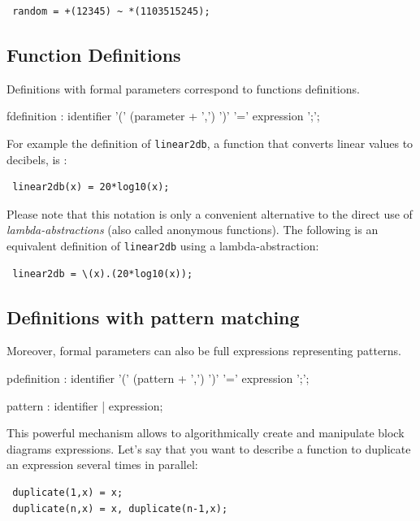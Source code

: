 \begin{lstlisting}
 random = +(12345) ~ *(1103515245);
\end{lstlisting}

\subsection{Function Definitions}

Definitions with formal parameters correspond to functions definitions.

\begin{rail}
fdefinition  : identifier '(' (parameter + ',')  ')' '=' expression ';';
\end{rail} 

For example the definition of \lstinline'linear2db', a function that converts linear values to decibels, is :

\begin{lstlisting}
 linear2db(x) = 20*log10(x);
\end{lstlisting}
 
Please note that this notation is only a convenient alternative to the direct use of \textit{lambda-abstractions} (also called anonymous functions). The following is an equivalent definition of \lstinline'linear2db' using a lambda-abstraction:

\begin{lstlisting}
 linear2db = \(x).(20*log10(x));
\end{lstlisting}

\subsection{Definitions with pattern matching}

Moreover, formal parameters can also be full expressions representing patterns. 
\begin{rail}
pdefinition  : identifier '(' (pattern + ',')  ')' '=' expression ';';
\end{rail}

\begin{rail}
pattern : identifier | expression; 
\end{rail}

This powerful mechanism allows to algorithmically create and manipulate block diagrams expressions. Let's say that you want to describe a function to duplicate an expression several times in parallel:
\begin{lstlisting}
 duplicate(1,x) = x;
 duplicate(n,x) = x, duplicate(n-1,x);
\end{lstlisting}

